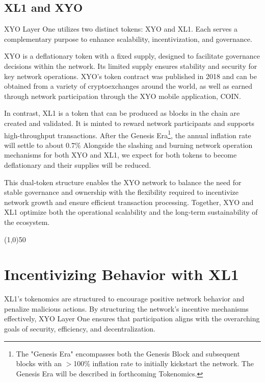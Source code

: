 \documentclass{article}
\begin{document}
\subsection{XL1 and XYO}
XYO Layer One utilizes two distinct tokens: XYO and XL1. Each serves a complementary purpose to enhance scalability, incentivization, and governance. 

XYO is a deflationary token with a fixed supply, designed to facilitate governance decisions within the network. Its limited supply ensures stability and security for key network operations. XYO's token contract was published in 2018 and can be obtained from a variety of cryptoexchanges around the world, as well as earned through network participation through the XYO mobile application, COIN.

In contrast, XL1 is a token that can be produced as blocks in the chain are created and validated. It is minted to reward network participants and supports high-throughput transactions. After the Genesis Era\footnote{The "Genesis Era" encompasses both the Genesis Block and subsequent blocks with an $>$100\% inflation rate to initially kickstart the network. The Genesis Era will be described in forthcoming Tokenomics.}, the annual inflation rate will settle to about \(0.7\%\) Alongside the slashing and burning network operation mechanisms for both XYO and XL1, we expect for both tokens to become deflationary and their supplies will be reduced.

This dual-token structure enables the XYO network to balance the need for stable governance and ownership with the flexibility required to incentivize network growth and ensure efficient transaction processing. Together, XYO and XL1 optimize both the operational scalability and the long-term sustainability of the ecosystem. 

\begin{center}
    \line(1,0){50}
\end{center}

\section{Incentivizing Behavior with XL1}
XL1's tokenomics are structured to encourage positive network behavior and penalize malicious actions. 
By structuring the network's incentive mechanisms effectively, XYO Layer One ensures that participation aligns with the overarching goals of security, efficiency, and decentralization. 
\end{document}
